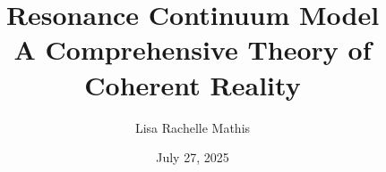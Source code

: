 \documentclass[12pt,oneside]{book}
\theoremstyle{proposition}
\theoremstyle{lemma}
\theoremstyle{remark}
\theoremstyle{corollary}
\begin{document}
\frontmatter

\title{\Huge \textbf{Resonance Continuum Model} \\[1em]
       \Large A Comprehensive Theory of Coherent Reality}
\author{\Large Lisa Rachelle Mathis}
\date{July 27, 2025}
\maketitle
\clearpage

\tableofcontents

\clearpage























\end{document}
